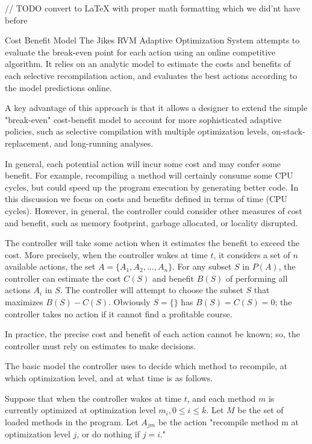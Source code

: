 // TODO convert to LaTeX with proper math formatting which we did'nt have before
\begin{section}{Cost Benefit Model}
The Jikes RVM Adaptive Optimization System attempts to evaluate the break-even point for each action using an online competitive algorithm.  It relies on an analytic model to estimate the costs and benefits of each selective recompilation action, and evaluates the best actions according to the model predictions online.

A key advantage of this approach is that it allows a designer to extend the simple "break-even" cost-benefit model to account for more sophisticated adaptive policies, such as selective compilation with multiple optimization levels, on-stack-replacement, and long-running analyses.

In general, each potential action will incur some cost and may confer some benefit. For example, recompiling a method will certainly consume some CPU cycles, but could speed up the program execution by generating better code. In this discussion we focus on costs and benefits defined in terms of time (CPU cycles). However, in general, the controller could consider other measures of cost and benefit, such as memory footprint, garbage allocated, or locality disrupted.

The controller will take some action when it estimates the benefit to exceed the cost. More precisely, when the controller wakes at time $t$, it considers a set of $n$ available actions, the set $A = \{A_1, A_2, ..., A_n\}$. For any subset $S$ in $P(A)$, the controller can estimate the cost $C(S)$ and benefit $B(S)$ of performing all actions $A_i$ in $S$. The controller will attempt to choose the subset $S$ that maximizes $B(S) - C(S)$. Obviously $S = \{\}$ has $B(S) = C(S) = 0$; the controller takes no action if it cannot find a profitable course.

In practice, the precise cost and benefit of each action cannot be known; so, the controller must rely on estimates to make decisions.

The basic model the controller uses to decide which method to recompile, at which optimization level, and at what time is as follows.

Suppose that when the controller wakes at time $t$, and each method $m$ is currently optimized at optimization level $m_i, 0 \leq i \leq k$. Let $M$ be the set of loaded methods in the program. Let $A_{jm}$ be the action "recompile method m at optimization level $j$, or do nothing if $j = i$."


\end{section}
